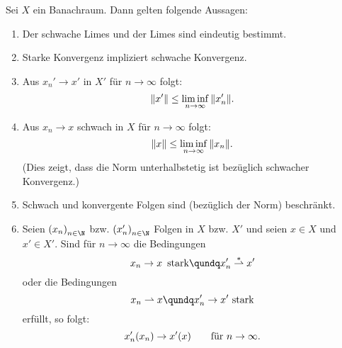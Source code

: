 \begin{thLemma} \label{vl16:lemma7.6}
    Sei $X$ ein Banachraum. Dann gelten folgende Aussagen:
    \begin{enumerate}[(1)]
        \item \label{vl16:lemma7.6:1}
            Der schwache Limes und der \schwachstern Limes sind eindeutig bestimmt.
        
        \item \label{vl16:lemma7.6:2}
            Starke Konvergenz impliziert schwache Konvergenz.
            
        \item \label{vl16:lemma7.6:3}
            Aus $x_n'\to x'$ \schwachstern in $X'$ für $n\to\infty$ folgt:
            \[ \norm{x'} \leq \liminf_{n\to\infty} \, \norm{x_n'}  . \]
            
        \item \label{vl16:lemma7.6:4}
            Aus $x_n\to x$ schwach in $X$ für $n\to\infty$ folgt:
            \[ \norm{x} \leq \liminf_{n\to\infty} \, \norm{x_n}  . \]
            (Dies zeigt, dass die Norm unterhalbstetig ist bezüglich schwacher
            Konvergenz.)
            
        \item \label{vl16:lemma7.6:5}
            Schwach und \schwachstern konvergente Folgen sind (bezüglich der Norm)
            beschränkt.
            
        \item \label{vl16:lemma7.6:6}
            Seien $\nSeq x$ bzw. $\nSeq{x'}$ Folgen in $X$ bzw. $X'$ und seien
            $x\in X$ und $x'\in X'$. Sind für $n\to\infty$ die Bedingungen
            \[ x_n\to x \text{ \,stark} \qundq x'_n \weakstarto x' \]
            oder die Bedingungen
            \[ x_n\weakto x \qundq x'_n \to x' \text{ stark} \]
            erfüllt, so folgt:
            \[ x_n'(x_n) \to x'(x) \fuer n\to\infty  . \]
    \end{enumerate}
\end{thLemma}


